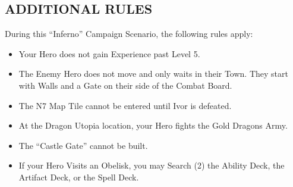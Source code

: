 \begin{multicols*}{2}
\subsection*{\MakeUppercase{Additional Rules}}

During this ``Inferno'' Campaign Scenario, the following rules apply:

\begin{itemize}
    \item Your Hero does not gain Experience past Level 5.
    \item The Enemy Hero does not move and only waits in their Town. They start with Walls and a Gate on their side of the Combat Board.
    \item The N7 Map Tile cannot be entered until Ivor is defeated.
    \item At the Dragon Utopia location, your Hero fights the Gold Dragons Army.
    \item The ``Castle Gate'' cannot be built.
    \item If your Hero Visits an Obelisk, you may Search (2) the Ability Deck, the Artifact Deck, or the Spell Deck.
\end{itemize}

\end{multicols*}

\begin{minipage}{\textwidth}
  \vspace{-2em}
\end{minipage}

